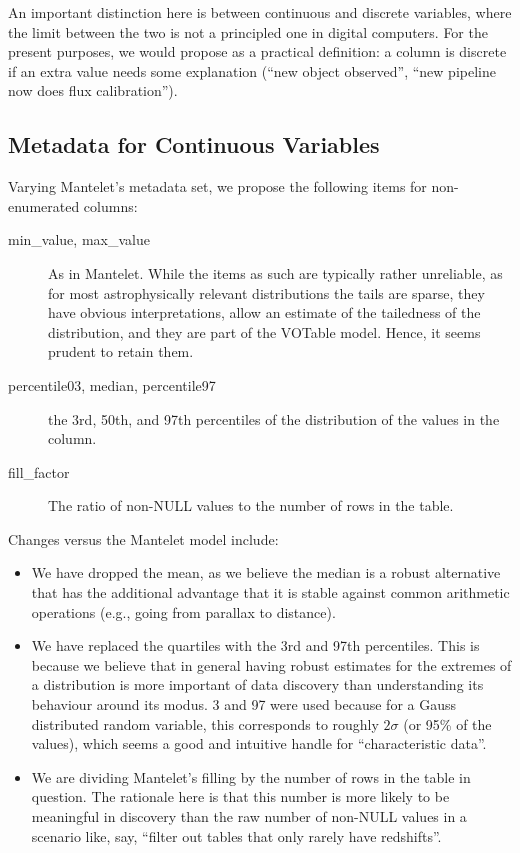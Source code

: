 \documentclass[11pt,a4paper]{ivoa}
\begin{document}
An important distinction here is between continuous and discrete
variables, where the limit between the two is not a principled one in
digital computers.  For the present purposes, we would propose as a
practical definition: a column is discrete if an extra value
needs some explanation (``new object observed'', ``new pipeline now does
flux calibration'').


\subsection{Metadata for Continuous Variables}

Varying Mantelet's metadata set, we propose the following items for
non-enumerated columns:

\begin{description}
\item[min\_value, max\_value] As in Mantelet.  While the items as such are
typically rather unreliable, as for most astrophysically relevant
distributions the tails are sparse, they have obvious interpretations,
allow an estimate of the tailedness of the distribution, and they are
part of the VOTable model.  Hence, it seems prudent to retain them.
\item[percentile03, median, percentile97] the 3rd, 50th, and 97th
percentiles of the distribution of the values in the column.
\item[fill\_factor] The ratio of non-NULL values to the number of rows
in the table.
\end{description}

Changes versus the Mantelet model include:

\begin{itemize}
\item We have dropped the mean, as we believe the median is a robust
alternative that has the additional advantage that it is stable against
common arithmetic operations (e.g., going from parallax to distance).
\item We have replaced the quartiles with the 3rd and 97th percentiles.
This is because we believe that in general having robust estimates for
the extremes of a distribution is more important of data discovery than
understanding its behaviour around its modus.  3 and 97 were used
because for a Gauss distributed random variable, this corresponds to
roughly $2\sigma$ (or 95\% of the values), which seems a good and
intuitive handle for ``characteristic data''.
\item We are dividing Mantelet's filling by the number of rows in the
table in question.  The rationale here is that this number is more
likely to be meaningful in discovery than the raw number of non-NULL
values in a scenario like, say, ``filter out tables that only rarely
have redshifts''.
\end{itemize}
\end{document}
